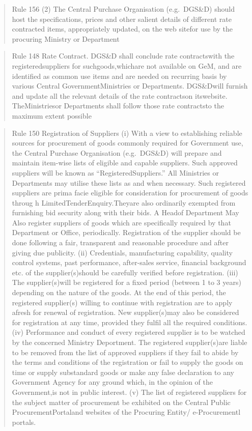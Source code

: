 \documentclass[
  10pt,
  twoside]{article}
\begin{document}
\begin{quote}
Rule 156 (2) The Central Purchase Organisation (e.g.~DGS\&D) should host
the specifications, prices and other salient details of different rate
contracted items, appropriately updated, on the web sitefor use by the
procuring Ministry or Department
\end{quote}

\begin{quote}
Rule 148 Rate Contract. DGS\&D shall conclude rate contractswith the
registeredsuppliers for suchgoods,whichare not available on GeM, and are
identified as common use items and are needed on recurring basis by
various Central GovernmentMinistries or Departments. DGS\&Dwill furnish
and update all the relevant details of the rate contractson itswebsite.
TheMinistriesor Departments shall follow those rate contractsto the
maximum extent possible
\end{quote}

\begin{quote}
Rule 150 Registration of Suppliers (i) With a view to establishing
reliable sources for procurement of goods commonly required for
Government use, the Central Purchase Organisation (e.g.~DGS\&D) will
prepare and maintain item-wise lists of eligible and capable suppliers.
Such approved suppliers will be known as ``RegisteredSuppliers.'' All
Ministries or Departments may utilise these lists as and when necessary.
Such registered suppliers are prima facie eligible for consideration for
procurement of goods throug h LimitedTenderEnquiry.Theyare also
ordinarily exempted from furnishing bid security along with their bids.
A Headof Department May Also register suppliers of goods which are
specifically required by that Department or Office, periodically.
Registration of the supplier should be done following a fair,
transparent and reasonable procedure and after giving due publicity.
(ii) Credentials, manufacturing capability, quality control systems,
past performance, after-sales service, financial background etc. of the
supplier(s)should be carefully verified before registration. (iii) The
supplier(s)will be registered for a fixed period (between 1 to 3 years)
depending on the nature of the goods. At the end of this period, the
registered supplier(s) willing to continue with registration are to
apply afresh for renewal of registration. New supplier(s)may also be
considered for registration at any time, provided they fulfil all the
required conditions. (iv) Performance and conduct of every registered
supplier is to be watched by the concerned Ministry Deportment. The
registered supplier(s)are liable to be removed from the list of approved
suppliers if they fail to abide by the terms and conditions of the
registration or fail to supply the goods on time or supply substandard
goods or make any false declaration to any Government Agency for any
ground which, in the opinion of the Government,is not in public
interest. (v) The list of registered suppliers for the subject matter of
procurement be exhibited on the Central Public ProcurementPortaland
websites of the Procuring Entity/ e-Procurementl portals.
\end{quote}
\end{document}
